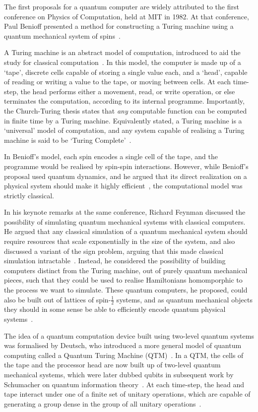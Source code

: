 The first proposals for a quantum computer are widely attributed to the first conference on Physics of Computation, held at MIT in 1982. At that conference, Paul Benioff presented a method for constructing a Turing machine using a quantum mechanical system of spins~\cite{Benioff1980}.\par
A Turing machine is an abstract model of computation, introduced to aid the study for classical computation~\cite{Nielsen2000}. In this model, the computer is made up of a `tape', discrete cells capable of storing a single value each, and a `head', capable of reading or writing a value to the tape, or moving between cells. At each time-step, the head performs either a movement, read, or write operation, or else terminates the computation, according to its internal programme. Importantly, the Church-Turing thesis states that \emph{any} computable function can be computed in finite time by a Turing machine. Equivalently stated, a Turing machine is a `universal' model of computation, and any system capable of realising a Turing machine is said to be `Turing Complete'~\cite{Nielsen2000}.\par
In Benioff's model, each spin encodes a single cell of the tape, and the programme would be realised by spin-spin interactions. However, while Benioff's proposal used quantum dynamics, and he argued that its direct realization on a physical system should make it highly efficient~\cite{Benioff1980}, the computational model was strictly classical.\par
In his keynote remarks at the same conference, Richard Feynman discussed the possibility of simulating quantum mechanical systems with classical computers. He argued that any classical simulation of a quantum mechanical system should require resources that scale exponentially in the size of the system, and also discussed a variant of the sign problem, arguing that this made classical simulation intractable~\cite{Feynman1982}. Instead, he considered the possibility of building computers distinct from the Turing machine, out of purely quantum mechanical pieces, such that they could be used to realise Hamiltonians homomporphic to the process we want to simulate. These quantum computers, he proposed, could also be built out of lattices of spin-$\frac{1}{2}$ systems, and as quantum mechanical objects they should in some sense be able to efficiently encode quantum physical systems~\cite{Feynman1982}.\par
The idea of a quantum computation device built using two-level quantum systems was formalised by Deutsch, who introduced a more general model of quantum computing called a Quantum Turing Machine (QTM)~\cite{Deutsch1985}. In a QTM, the cells of the tape and the processor head are now built up of two-level quantum mechanical systems, which were later dubbed qubits in subsequent work by Schumacher on quantum information theory~\cite{Schumacher1995}. At each time-step, the head and tape interact under one of a finite set of unitary operations, which are capable of generating a group dense in the group of all unitary operations~\cite{Deutsch1985}.\par
